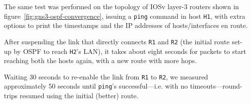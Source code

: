 The same test was performed on the topology of IOSv layer-3 routers shown in figure~\ref{fig:gns3-ospf-convergence}, issuing a \texttt{ping} command in host \texttt{H1}, with extra options to print the timestamps and the IP addresses of hosts/interfaces en route.



After suspending the link that directly connects \texttt{R1} and \texttt{R2} (the initial route set-up by OSPF to reach \texttt{H2}'s LAN), it takes about eight seconds for packets to start reaching both the hosts again, with a new route with more hops.

Waiting 30 seconds to re-enable the link from \texttt{R1} to \texttt{R2}, we measured approximately 50 seconds until \texttt{ping}'s successful---i.e. with no timeouts---round-trips resumed using the initial (better) route.

